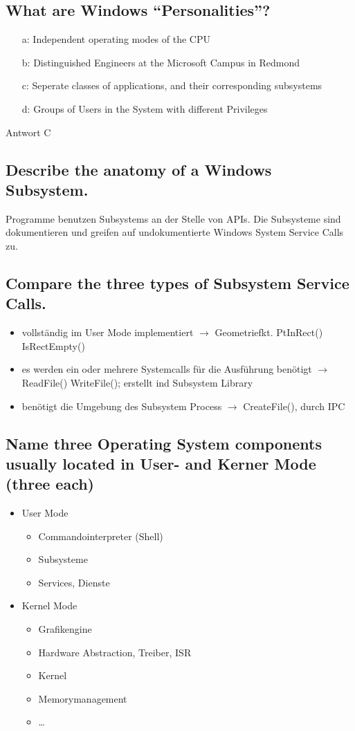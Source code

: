 \subsection{What are Windows ``Personalities''?}
\begin{enumerate}
	\item[a:] Independent operating modes of the CPU
	\item[b:] Distinguished Engineers at the Microsoft Campus in Redmond
	\item[c:] Seperate classes of applications, and their corresponding subsystems
	\item[d:] Groups of Users in the System with different Privileges
\end{enumerate}
Antwort C

\subsection{\important Describe the anatomy of a Windows Subsystem.}
Programme benutzen Subsystems an der Stelle von APIs. Die Subsysteme sind dokumentieren und greifen auf undokumentierte Windows System Service Calls zu.

\subsection{Compare the three types of Subsystem Service Calls.}
\begin{itemize}
	\setlength\itemsep{-0.5em}
	\item vollst\"andig im User Mode implementiert $\rightarrow$ Geometriefkt. PtInRect() IsRectEmpty()
	\item es werden ein oder mehrere Systemcalls f\"ur die Ausf\"uhrung ben\"otigt $\rightarrow$ ReadFile() WriteFile(); erstellt ind Subsystem Library
	\item ben\"otigt die Umgebung des Subsystem Process $\rightarrow$ CreateFile(), durch IPC 
\end{itemize}

\subsection{Name three Operating System components usually located in User- and Kerner Mode (three each)}
\begin{itemize}
	\setlength\itemsep{-0.5em}
	\item User Mode
	\begin{itemize}
		\item Commandointerpreter (Shell)
		\item Subsysteme
		\item Services, Dienste
	\end{itemize}
	\item Kernel Mode
	\begin{itemize}
		\item Grafikengine
		\item Hardware Abstraction, Treiber, ISR
		\item Kernel
		\item Memorymanagement
		\item \dots
	\end{itemize}
\end{itemize}


